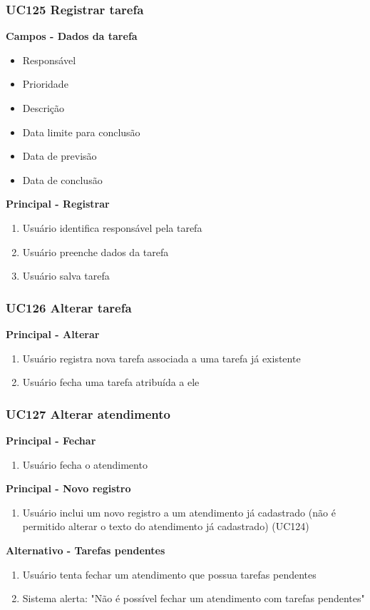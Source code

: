 \subsubsection{UC125 Registrar tarefa}

\textbf{Campos - Dados da tarefa}

\begin{itemize}
\item Responsável
\item Prioridade
\item Descrição
\item Data limite para conclusão
\item Data de previsão
\item Data de conclusão
\end{itemize}

\textbf{Principal - Registrar}

\begin{enumerate}
\item Usuário identifica responsável pela tarefa
\item Usuário preenche dados da tarefa
\item Usuário salva tarefa
\end{enumerate}

\subsubsection{UC126 Alterar tarefa}

\textbf{Principal - Alterar}

\begin{enumerate}
\item Usuário registra nova tarefa associada a uma tarefa já existente
\item Usuário fecha uma tarefa atribuída a ele
\end{enumerate}

\subsubsection{UC127 Alterar atendimento}

\textbf{Principal - Fechar}

\begin{enumerate}
\item Usuário fecha o atendimento
\end{enumerate}

\textbf{Principal - Novo registro}

\begin{enumerate}
\item Usuário inclui um novo registro a um atendimento já cadastrado (não é permitido alterar o texto do atendimento já cadastrado) (UC124)
\end{enumerate}

\textbf{Alternativo - Tarefas pendentes}

\begin{enumerate}
\item Usuário tenta fechar um atendimento que possua tarefas pendentes
\item Sistema alerta: "Não é possível fechar um atendimento com tarefas pendentes"
\end{enumerate}